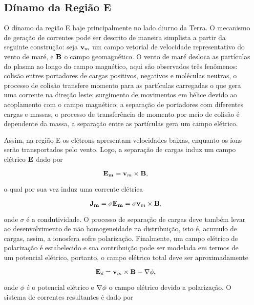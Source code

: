 \subsection{Dínamo da Região E} 

O dínamo da região E haje principalmente no lado diurno da Terra. O mecanismo de geração de correntes pode ser descrito de maneira simplista a partir da seguinte construção: seja ${\bf v}_m$ um campo vetorial de velocidade representativo do vento de maré, e ${\bf B}$ o campo geomagnético. O vento de maré desloca as partículas do plasma ao longo do campo magnético, aqui são observados três fenômenos: colisão entres portadores de cargas positivos, negativos e moléculas neutras, o processo de colisão transfere momento para as partículas carregadas o que gera uma corrente na direção leste; surgimento de movimentos em hélice devido ao acoplamento com o campo magnético; a separação de portadores com diferentes cargas e massas, o processo de transferência de momento por meio de colisão é dependente da massa, a separação entre as partículas gera um campo elétrico.

Assim, na região E os elétrons apresentam velocidades baixas, enquanto os íons serão transportados pelo vento. Logo, a separação de cargas induz um campo elétrico ${\bf E}$ dado por 

\begin{equation}
{\bf E_m} = {\bf v}_m\times{\bf B}\mbox{,}~
\end{equation}

o qual por sua vez induz uma corrente elétrica

\begin{equation}
{\bf J_m}=\sigma{\bf E_m} = \sigma{\bf v}_m\times{\bf B}\mbox{,}~
\end{equation}

onde $\sigma$ é a condutividade. O processo de separação de cargas deve também levar ao desenvolvimento de não homogeneidade na distribuição, isto é, acumulo de cargas, assim, a ionosfera sofre polarização. Finalmente, um campo elétrico de polarização é estabelecido e sua contribuição pode ser modelada em termos de um potencial elétrico, portanto, o campo elétrico total deve ser aproximadamente

\begin{equation}
{\bf E}_d = {\bf v}_m\times{\bf B}-{\bf \nabla}\phi\mbox{,}~
\end{equation}

onde $\phi$ é o potencial elétrico e ${\bf \nabla}\phi$ o campo elétrico devido a polarização. O sistema de correntes resultantes é dado por

